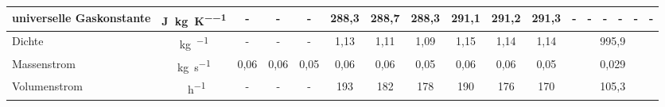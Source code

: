 \begin{landscape}
\begin{table}[h!]
{\begin{tabular}{l|c|c|c|c|c|c|c|c|c|c|c|c|c|c|c|c}
				universelle Gaskonstante & \si{\joule \per \kg \per \kelvin} & -     & -     & -     & 288,3 & 288,7 & 288,3 & 291,1& 291,2 & 291,3 & -     & -     & -     & -     & -     & - \\
				\hline
				Dichte & \si{\kg\per\kmeter} & -     & -     & -     & \multicolumn{1}{c|}{1,13} & \multicolumn{1}{c|}{1,11} & 1,09  & \multicolumn{1}{c|}{1,15} & \multicolumn{1}{c|}{1,14} & \multicolumn{1}{c|}{1,14} & \multicolumn{6}{c}{995,9} \\
				\hline
				Massenstrom & \si{\kg\per\second}  &   0,06&0,06&0,05 &0,06&0,06&0,05  &0,06&0,06&0,05  & \multicolumn{6}{c}{0,029} \\
				\hline
				Volumenstrom & \si{\kmeter \per \hour} & -     & -     & -     & 193   & 182   & 178   & 190   & 176   & 170   & \multicolumn{6}{c}{105,3} \\
			\end{tabular}
		}
	\end{table}%
	\FloatBarrier
\end{landscape}


